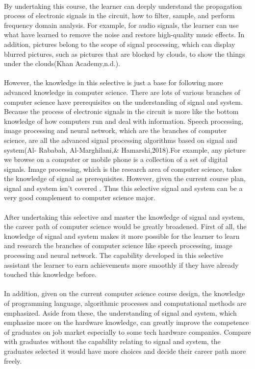 \documentclass{article}
\begin{document}
	\\
	By undertaking this course, the learner can deeply understand the propagation process of electronic signals in the circuit, how to filter, sample, and perform frequency domain analysis. For example, for audio signals, the learner can use what have learned to remove the noise and restore high-quality music effects. In addition, pictures belong to the scope of signal processing, which can display blurred pictures, such as pictures that are blocked by clouds, to show the things under the clouds(Khan Academy,n.d.). \\
	\\
	However, the knowledge in this selective is just a base for following more advanced knowledge in computer science. There are lots of various branches of computer science have prerequisites on the understanding of signal and system. Because the process of electronic signals in the circuit is more like the bottom knowledge of how computers run and deal with information. Speech processing, image processing and neural network, which are the branches of computer science, are all the advanced signal processing algorithms based on signal and system(Al- Rababah, Al-Marghilani,& Hamarshi,2018).For example, any picture we browse on a computer or mobile phone is a collection of a set of digital signals. Image processing, which is the research area of computer science, takes the knowledge of signal as prerequisites. However, given the current course plan, signal and system isn't covered . Thus this selective signal and system can be a very good complement to computer science major. \\
	\\
	After undertaking this selective and master the knowledge of signal and system, the career path of computer science would be greatly broadened. First of all, the knowledge of signal and system makes it more possible for the learner to learn and research the branches of computer science like speech processing, image processing and neural network. The capability developed in this selective assistant the learner to earn achievements more smoothly if they have already touched this knowledge before.\\
	\\
	In addition, given on the current computer science course design, the knowledge of programming language, algorithmic processes and computational methods are emphasized. Aside from these, the understanding of signal and system, which emphasize more on the hardware knowledge, can greatly improve the competence of graduates on job market especially to some tech hardware companies. Compare with graduates without the capability relating to signal and system, the graduates selected it would have more choices and decide their career path more freely.
\end{document}
